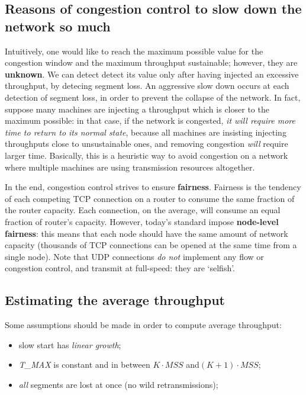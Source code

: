 \documentclass[10pt]{book}
\begin{document}
\subsection{Reasons of congestion control to slow down the network so much}

Intuitively, one would like to reach the maximum possible value for the
congestion window and the maximum throughput sustainable; however, they are
\textbf{unknown}. We can detect detect its value only after having injected an
excessive throughput, by detecing segment loss. An aggressive slow down occurs
at each detection of segment loss, in order to prevent the collapse of the
network. In fact, suppose many machines are injecting a throughput which is
closer to the maximum possible: in that case, if the network is congested,
\emph{it will require more time to return to its normal state}, because all
machines are insisting injecting throughputs close to unsustainable ones, and
removing congestion \emph{will} require larger time. Basically, this is a
heuristic way to avoid congestion on a network where multiple machines are
using transmission resources altogether.

In the end, congestion control strives to ensure \textbf{fairness}. Fairness is
the tendency of each competing TCP connection on a router to consume the same
fraction of the router capacity. Each connection, on the average, will consume
an equal fraction of router's capacity. However, today's standard impose
\textbf{node-level fairness}: this means that each node should have the same
amount of network capacity (thousands of TCP connections can be opened at the
same time from a single node). Note that UDP connections \emph{do not}
implement any flow or congestion control, and transmit at full-speed: they are
`selfish'.

\subsection{Estimating the average throughput}

Some assumptions should be made in order to compute average throughput:
\begin{itemize}
    \item slow start has \emph{linear growth};
    \item \emph{T\_MAX} is constant and in between $K\cdot MSS$ and$(K+1)\cdot MSS$;
    \item \emph{all} segments are lost at once (no wild retransmissions);
\end{itemize}
\end{document}
